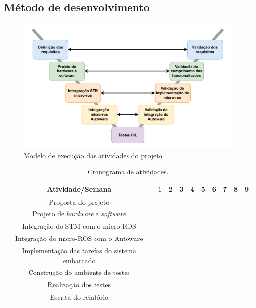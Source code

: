 \subsection{Método de desenvolvimento}


\begin{figure}[H]
	\centering
	\includegraphics[width=0.75\linewidth]{img/modelo-v}
	\caption{Modelo de execução das atividades do projeto.}
	\label{fig:modelo-v}
\end{figure}

\begin{table}[H]
	\centering
	\small{
		\begin{tabular}{|c|c|c|c|c|c|c|c|c|c|}
			\hline
			\textbf{Atividade/Semana} & 1 & \textbf{2} & 3 & \textbf{4} & 5 & 6 & \textbf{7} & 8 & \textbf{9} \\
			\hline
			Proposta do projeto  & \cellcolor{unifeiblue} &  &  &  &  &  &  &  &  \\
			\hline
			Projeto de \textit{hardware} e \textit{software}  &  & \cellcolor{unifeiblue} & \cellcolor{unifeiblue} &  &  &  &  &  &  \\
			\hline
			Integração do STM com o micro-ROS  &  & \cellcolor{unifeiblue} &  &  &  &  &  &  &  \\
			\hline
			Integração do micro-ROS com o Autoware  &  &  & \cellcolor{unifeiblue} & \cellcolor{unifeiblue} & \cellcolor{unifeiblue} &  &  &  &  \\
			\hline
			Implementação das tarefas do sistema embarcado  &  &  &  & \cellcolor{unifeiblue} & \cellcolor{unifeiblue} & \cellcolor{unifeiblue} & \cellcolor{unifeiblue} &  &  \\
			\hline
			Construção do ambiente de testes  &  &  &  &  & \cellcolor{unifeiblue} & \cellcolor{unifeiblue} & \cellcolor{unifeiblue} &  &  \\
			\hline
			Realização dos testes  &  &  &  &  &  &  & \cellcolor{unifeiblue} & \cellcolor{unifeiblue} & \cellcolor{unifeiblue} \\
			\hline
			Escrita do relatório  &   & \cellcolor{unifeiblue} & \cellcolor{unifeiblue} & \cellcolor{unifeiblue} & \cellcolor{unifeiblue} & \cellcolor{unifeiblue} & \cellcolor{unifeiblue} & \cellcolor{unifeiblue} & \cellcolor{unifeiblue} \\
			\hline
		\end{tabular}
	}
	\caption{Cronograma de atividades.}
	\label{tab:crono}
\end{table}


